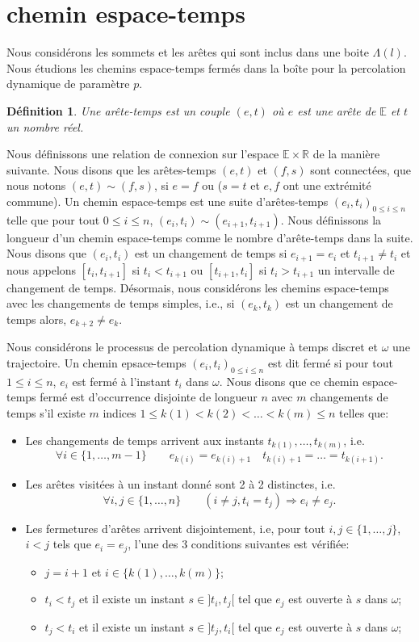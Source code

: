 \documentclass[titlepage,a4paper,12pt]{article}
\newcounter{d}
\newcounter{t}
\newcounter{p}
\newcounter{c}
\newcounter{a}
\newcounter{l}
\newtheorem{defi}[d]{Définition}
\begin{document}
\section{chemin espace-temps}
Nous considérons les sommets et les arêtes qui sont inclus dans une boite $\Lambda(l)$. Nous étudions les chemins espace-temps fermés dans la boîte pour la percolation dynamique de paramètre $p$.
\begin{defi}
Une arête-temps est un couple $(e,t)$ où $e$ est une arête de $\mathbb{E}$ et $t$ un nombre réel. 
\end{defi}

Nous définissons une relation de connexion sur l'espace $\mathbb{E}\times \mathbb{R}$ de la manière suivante. Nous disons que les arêtes-temps $(e,t)$ et $(f,s)$ sont connectées, que nous notons $(e,t)\sim(f,s)$, si $e=f$ ou ($s=t$ et $e,f$ ont une extrémité commune). Un chemin espace-temps est une suite d'arêtes-temps $(e_i,t_i)_{0\leqslant i\leqslant n}$ telle que pour tout $ 0\leqslant i \leqslant n$, $(e_i,t_i)\sim(e_{i+1},t_{i+1})$. Nous définissons la longueur d'un chemin espace-temps comme le nombre d'arête-temps dans la suite. Nous disons que $(e_i,t_i)$ est un changement de temps si $e_{i+1} = e_i$ et $t_{i+1}\neq t_i$ et nous appelons $[t_i,t_{i+1}]$ si $t_i<t_{i+1}$ ou $[t_{i+1},t_i]$ si $t_i> t_{i+1}$ un intervalle de changement de temps. Désormais, nous considérons les chemins espace-temps avec les changements de temps simples, i.e., si $(e_k,t_k)$ est un changement de temps alors, $e_{k+2} \neq e_k$. 

Nous considérons le processus de percolation dynamique à temps discret et $\omega$ une trajectoire. Un chemin epsace-temps $(e_i,t_i)_{0\leqslant i \leqslant n}$ est dit fermé si pour tout $1\leqslant i\leqslant n$, $e_i$ est fermé à l'instant $t_i$ dans $\omega$. Nous disons que ce chemin espace-temps fermé est d'occurrence disjointe de longueur $n$ avec $m$ changements de temps s'il existe $m$ indices $1\leqslant k(1)< k(2) < \dots < k(m) \leqslant n$ telles que:
\begin{itemize}[label = $\bullet$, leftmargin = *]
\item Les changements de temps arrivent aux instants $t_{k(1)},\dots, t_{k(m)}$, i.e.
$$\forall i\in \{1,\dots, m-1\} \qquad e_{k(i)} = e_{k(i)+1} \quad t_{k(i)+1} =\dots = t_{k(i+1)}.
$$
\item Les arêtes visitées à un instant donné sont 2 à 2 distinctes, i.e.
$$ \forall i,j \in \{1,\dots, n\} \qquad (i\neq j, t_i = t_j) \Rightarrow e_i\neq e_j.
$$
\item Les fermetures d'arêtes arrivent disjointement, i.e, pour tout $i,j\in \{1,\dots, j\}$, $i<j$ tels que $e_i = e_j$, l'une des 3 conditions suivantes est vérifiée:
\begin{itemize}[label=$\bullet$]
\item $j=i+1$ et $i\in \{k(1),\dots, k(m)\}$;
\item $t_i< t_j$ et il existe un instant $s\in ]t_i,t_j[$ tel que $e_j$ est ouverte à $s$ dans $\omega$;
\item $t_j< t_i$ et il existe un instant $s\in ]t_j,t_i[$ tel que $e_j$ est ouverte à $s$ dans $\omega$;
\end{itemize}
\end{itemize}
\end{document}

